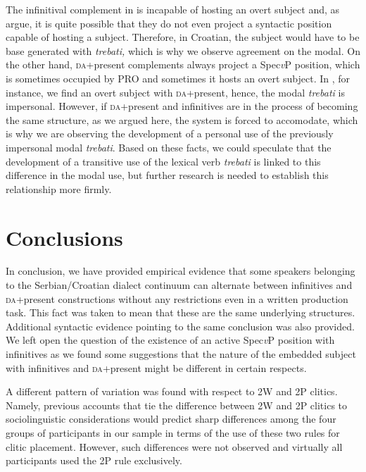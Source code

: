 \documentclass[output=paper,modfonts,newtxmath,hidelinks,]{langscibook}
\begin{document}
\noindent The infinitival complement in  is incapable of hosting an overt subject and, as \citet{TodorovicWurmbrand2015} argue, it is quite possible that they do not even project a syntactic position capable of hosting a subject. Therefore, in Croatian, the subject would have to be base generated with \textit{trebati,} which is why we observe agreement on the modal. On the other hand, \textsc{da}+present complements always project a Spec\textit{v}P position, which is sometimes occupied by PRO and sometimes it hosts an overt subject. In , for instance, we find an overt subject with \textsc{da}+present, hence, the modal \textit{trebati} is impersonal. However, if \textsc{da}+present and infinitives are in the process of becoming the same structure, as we argued here, the system is forced to accomodate, which is why we are observing the development of a personal use of the previously impersonal modal \textit{trebati}. Based on these facts, we could speculate that the development of a transitive use of the lexical verb \textit{trebati} is linked to this difference in the modal use, but further research is needed to establish this relationship more firmly.

\section{Conclusions}\label{7:s5}

In conclusion, we have provided empirical evidence that some speakers belonging to the Serbian/Croatian dialect continuum can alternate between infinitives and \textsc{da}+present constructions without any restrictions even in a written production task. This fact was taken to mean that these are the same underlying structures. Additional syntactic evidence pointing to the same conclusion was also provided. We left open the question of the existence of an active Spec\textit{v}P position with infinitives as we found some suggestions that the nature of the embedded subject with infinitives and \textsc{da}+present might be different in certain respects.

A different pattern of variation was found with respect to 2W and 2P clitics. Namely, previous accounts that tie the difference between 2W and 2P clitics to sociolinguistic considerations would predict sharp differences among the four groups of participants in our sample in terms of the use of these two rules for clitic placement. However, such differences were not observed and virtually all participants used the 2P rule exclusively.\largerpage
\end{document}

